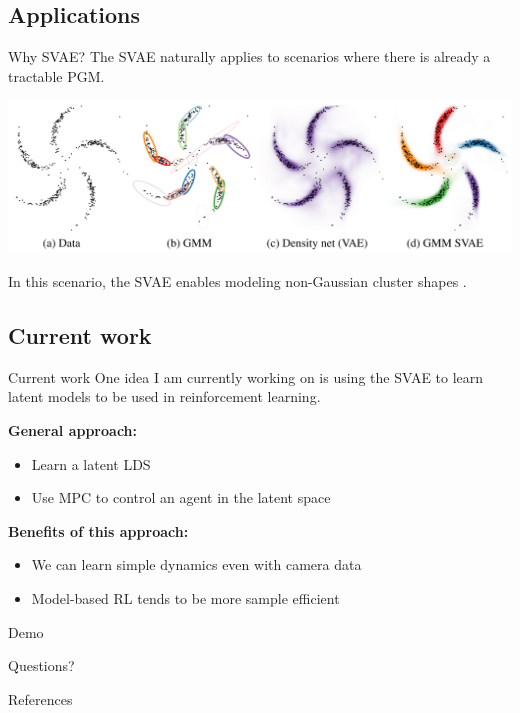 \documentclass[10pt, compress]{beamer}
\begin{document}
\subsection{Applications}
\begin{frame}{Why SVAE?}
  The SVAE naturally applies to scenarios where there is already a tractable PGM.

  \pause
  \begin{center}
    \includegraphics[frame,width=\textwidth]{img/svae-example}
  \end{center}

  \pause
  In this scenario, the SVAE enables modeling non-Gaussian cluster shapes \cite{svae}.
\end{frame}

\subsection{Current work}
\begin{frame}{Current work}
  One idea I am currently working on is using the SVAE to learn
  latent models to be used in reinforcement learning\footnotemark.

  \pause
  \textbf{General approach:}
  \begin{itemize}
    \item Learn a latent LDS
    \item Use MPC to control an agent in the latent space
  \end{itemize}

  \pause
  \textbf{Benefits of this approach:}
  \begin{itemize}
      \pause
    \item We can learn simple dynamics even with camera data
      \pause
    \item Model-based RL tends to be more sample efficient
      \pause
  \end{itemize}
  \pause
  \alert{Demo}
\end{frame}

\begin{frame}[standout]
Questions?
\end{frame}

\appendix
\begin{frame}[allowframebreaks]{References}
  
  
\end{frame}
\end{document}
